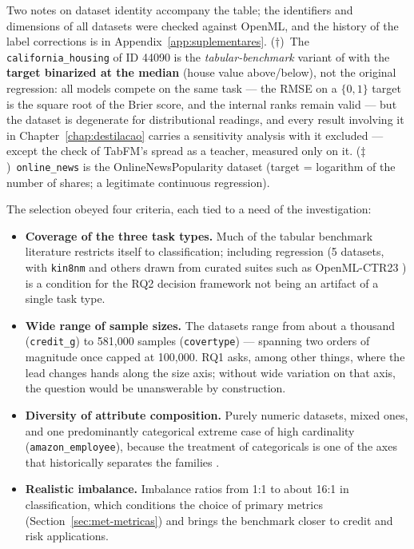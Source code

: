 Two notes on dataset identity accompany the table; the identifiers and
dimensions of all datasets were checked against OpenML, and the
history of the label corrections is in
Appendix~\ref{app:suplementares}. ($\dagger$)~The
\texttt{california\_\allowbreak housing} of ID 44090 is the
\emph{tabular-benchmark} variant of \citet{grinsztajn2022} with the
\textbf{target binarized at the median} (house value above/below),
not the original regression: all models compete on the same task ---
the RMSE on a $\{0,1\}$ target is the square root of the Brier score,
and the internal ranks remain valid --- but the dataset is degenerate
for distributional readings, and every result involving it in
Chapter~\ref{chap:destilacao} carries a sensitivity analysis with it
excluded --- except the check of TabFM's spread as a teacher,
measured only on it. ($\ddagger$)~\texttt{online\_news} is the
OnlineNewsPopularity dataset (target = logarithm of the number of
shares; a legitimate continuous regression).

The selection obeyed four criteria, each tied to a need of the
investigation:

\begin{itemize}
  \item \textbf{Coverage of the three task types.} Much of the
    tabular benchmark literature restricts itself to classification;
    including regression (5 datasets, with \texttt{kin8nm} and
    others drawn from curated suites such as OpenML-CTR23
    \citep{fischer2023}) is a condition for the RQ2 decision
    framework not being an artifact of a single task type.
  \item \textbf{Wide range of sample sizes.} The
    datasets range from about a thousand (\texttt{credit\_g}) to
    581{,}000 samples (\texttt{covertype}) --- spanning two orders of
    magnitude once capped at 100{,}000. RQ1 asks, among other
    things, where the lead changes hands along the size axis;
    without wide variation on that axis, the question would be
    unanswerable by construction.
  \item \textbf{Diversity of attribute composition.} Purely numeric
    datasets, mixed ones, and one predominantly categorical extreme
    case of high cardinality
    (\texttt{amazon\_\allowbreak employee}), because the treatment
    of categoricals is one of the axes that historically separates
    the families \citep{grinsztajn2022, mcelfresh2023}.
  \item \textbf{Realistic imbalance.} Imbalance ratios from 1:1 to
    about 16:1 in classification, which conditions the choice of
    primary metrics (Section~\ref{sec:met-metricas}) and brings the
    benchmark closer to credit and risk applications.
\end{itemize}

